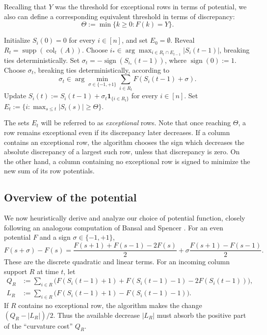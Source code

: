 \documentclass[reqno,english]{amsart}
\newcommand*{\ind}{\mathbf 1}
\newcommand*{\supp}{\operatorname{supp}}
\newcommand*{\sign}{\operatorname{sign}}
\newcommand*{\col}{\operatorname{col}}
\theoremstyle{definition}
\begin{document}
Recalling that $Y$ was the threshold for exceptional rows in terms of potential, we also can define a corresponding equivalent threshold in terms of discrepancy:
\begin{equation}\label{eq:Theta-def}
    \Theta:=\min\{k\ge0:F(k)=Y\}.
\end{equation}

\begin{algorithm}[H]
\caption{Online balancing}\label{alg:main}
\begin{algorithmic}[1]
\State Initialize $S_i(0)=0$ for every $i\in[n]$, and set $E_0=\emptyset$.
    \State Reveal $R_t=\supp(\col_t(A))$.
        \State Choose
        $i_*\in\arg\max_{i\in R_t\cap E_{t-1}}|S_i(t-1)|$,
        breaking ties deterministically.
        \State Set $\sigma_t=-\sign(S_{i_*}(t-1))$, where $\sign(0):=1$.
    \Else
        \State Choose $\sigma_t$, breaking ties deterministically, according to
        \Statex
        \begin{equation}\label{eq:algorithm-potential-choice}
        \sigma_t\in\arg\min_{\sigma\in\{-1,+1\}}
            \sum_{i\in R_t}F(S_i(t-1)+\sigma).
        \end{equation}
    \EndIf
    \State Update
    $S_i(t):=S_i(t-1)+\sigma_t\ind_{\{i\in R_t\}}$
    for every $i\in[n]$.
    \State Set $E_t:=\{i:\max_{s\le t}|S_i(s)|\ge\Theta\}$.
\EndFor
\end{algorithmic}
\end{algorithm}
The sets $E_t$ will be referred to as {\it exceptional} rows.
Note that once reaching $\Theta$, a row
remains exceptional even if its discrepancy later decreases.
If a column contains an exceptional row, the
algorithm chooses the sign which decreases the absolute discrepancy
of a largest such row, unless that discrepancy is zero.
On the other hand, a column containing no exceptional row is signed to minimize the new sum of its row potentials.  

\subsection{Overview of the potential}\label{sec:potential-overview}
We now heuristically derive and analyze our choice of potential function, closely following an analogous computation of Bansal and Spencer \cite[Section~2.1]{bansal-spencer}. For an even potential $F$ and a sign $\sigma\in\{-1,+1\}$,
\begin{equation}\label{eq:guiding-decomposition}
 F(s+\sigma)-F(s)
 =\frac{F(s+1)+F(s-1)-2F(s)}2
 +\sigma\frac{F(s+1)-F(s-1)}2.
\end{equation}
These are the discrete quadratic and linear terms. For an incoming
column support $R$ at time $t$, let
\begin{align*}
 Q_R&:=\sum_{i\in R}\big(F(S_i(t-1)+1)+F(S_i(t-1)-1)-2F(S_i(t-1))\big),\\
 L_R&:=\sum_{i\in R}\big(F(S_i(t-1)+1)-F(S_i(t-1)-1)\big).
\end{align*}
If $R$ contains no exceptional row, the algorithm makes the change
$(Q_R-|L_R|)/2$. Thus the available decrease $|L_R|$ must absorb the
positive part of the ``curvature cost'' $Q_R$.
\end{document}
